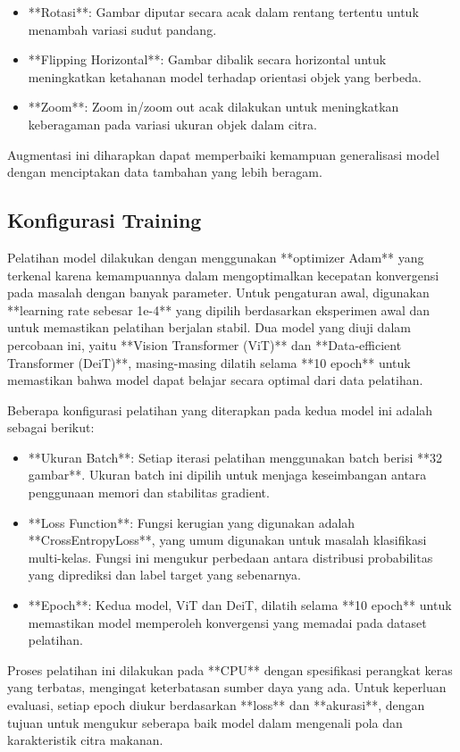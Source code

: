 \documentclass[11pt,a4paper]{article}
\begin{document}
\begin{itemize}
    \item **Rotasi**: Gambar diputar secara acak dalam rentang tertentu untuk menambah variasi sudut pandang.
    \item **Flipping Horizontal**: Gambar dibalik secara horizontal untuk meningkatkan ketahanan model terhadap orientasi objek yang berbeda.
    \item **Zoom**: Zoom in/zoom out acak dilakukan untuk meningkatkan keberagaman pada variasi ukuran objek dalam citra.
\end{itemize}

Augmentasi ini diharapkan dapat memperbaiki kemampuan generalisasi model dengan menciptakan data tambahan yang lebih beragam.

\subsection{Konfigurasi Training}
Pelatihan model dilakukan dengan menggunakan **optimizer Adam** yang terkenal karena kemampuannya dalam mengoptimalkan kecepatan konvergensi pada masalah dengan banyak parameter. Untuk pengaturan awal, digunakan **learning rate sebesar 1e-4** yang dipilih berdasarkan eksperimen awal dan untuk memastikan pelatihan berjalan stabil. Dua model yang diuji dalam percobaan ini, yaitu **Vision Transformer (ViT)** dan **Data-efficient Transformer (DeiT)**, masing-masing dilatih selama **10 epoch** untuk memastikan bahwa model dapat belajar secara optimal dari data pelatihan.

Beberapa konfigurasi pelatihan yang diterapkan pada kedua model ini adalah sebagai berikut:
\begin{itemize}
    \item **Ukuran Batch**: Setiap iterasi pelatihan menggunakan batch berisi **32 gambar**. Ukuran batch ini dipilih untuk menjaga keseimbangan antara penggunaan memori dan stabilitas gradient.
    \item **Loss Function**: Fungsi kerugian yang digunakan adalah **CrossEntropyLoss**, yang umum digunakan untuk masalah klasifikasi multi-kelas. Fungsi ini mengukur perbedaan antara distribusi probabilitas yang diprediksi dan label target yang sebenarnya.
    \item **Epoch**: Kedua model, ViT dan DeiT, dilatih selama **10 epoch** untuk memastikan model memperoleh konvergensi yang memadai pada dataset pelatihan.
\end{itemize}

Proses pelatihan ini dilakukan pada **CPU** dengan spesifikasi perangkat keras yang terbatas, mengingat keterbatasan sumber daya yang ada. Untuk keperluan evaluasi, setiap epoch diukur berdasarkan **loss** dan **akurasi**, dengan tujuan untuk mengukur seberapa baik model dalam mengenali pola dan karakteristik citra makanan.
\end{document}
